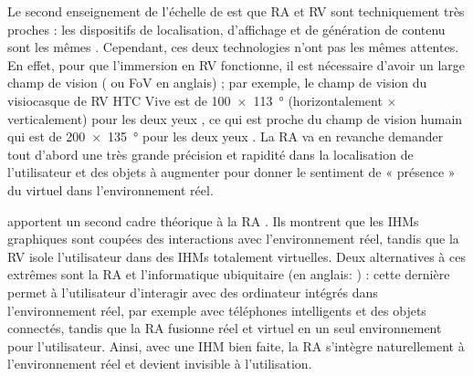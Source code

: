 Le second enseignement de l'échelle de \citeauthor{Milgram1994} est que RA et RV sont techniquement très proches : les dispositifs de localisation, d'affichage et de génération de contenu sont les mêmes \citep{Billinghurst2015}. Cependant, ces deux technologies n'ont pas les mêmes attentes. En effet, pour que l'immersion en RV fonctionne, il est nécessaire d'avoir un large champ de vision ( ou FoV en anglais) ; par exemple, le champ de vision du visiocasque de RV HTC Vive est de \SI{100x113}{\degree} (horizontalement $\times$ verticalement) pour les deux yeux \citep{Kreylos2016}, ce qui est proche du champ de vision humain qui est de \SI{200x135}{\degree} pour les deux yeux \citep{ROMANIA_engineer2015}. La RA va en revanche demander tout d'abord une très grande précision et rapidité dans la localisation de l'utilisateur et des objets à augmenter pour donner le sentiment de « présence » du virtuel dans l'environnement réel.


\cite{Rekimoto1995} apportent un second cadre théorique à la RA . Ils montrent que les IHMs graphiques sont coupées des interactions avec l'environnement réel, tandis que la RV isole l'utilisateur dans des IHMs totalement virtuelles. Deux alternatives à ces extrêmes sont la RA et l'informatique ubiquitaire (en anglais: ) : cette dernière permet à l'utilisateur d'interagir avec des ordinateur intégrés dans l'environnement réel, par exemple avec téléphones intelligents et des objets connectés, tandis que la RA fusionne réel et virtuel en un seul environnement pour l'utilisateur. Ainsi, avec une IHM bien faite, la RA s'intègre naturellement à l'environnement réel et devient invisible à l'utilisation.


